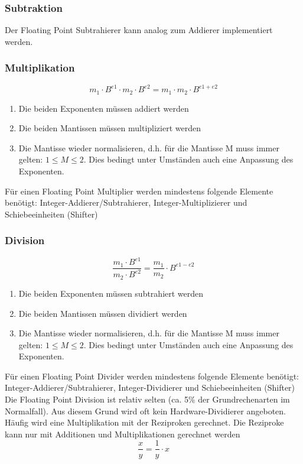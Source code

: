 \subsubsection{Subtraktion}
Der Floating Point Subtrahierer kann analog zum Addierer implementiert werden.

\subsubsection{Multiplikation}
\begin{equation}
	m_1 \cdot B^{e1} \cdot m_2 \cdot B^{e2} = m_1 \cdot m_2 \cdot B^{e1 + e2}
\end{equation}
\begin{enumerate}
	\item Die beiden Exponenten müssen addiert werden 
	\item Die beiden Mantissen müssen multipliziert werden 
	\item Die Mantisse wieder normalisieren, d.h. für die Mantisse M muss immer gelten: $1 \leq M \leq 2$. Dies bedingt unter Umständen auch eine Anpassung des Exponenten.	
\end{enumerate}
Für einen Floating Point Multiplier werden mindestens folgende Elemente benötigt: Integer-Addierer/Subtrahierer, Integer-Multiplizierer und Schiebeeinheiten (Shifter)

\subsubsection{Division}
\begin{equation}
\frac{m_1 \cdot B^{e1}}{m_2 \cdot B^{e2}} = \frac{m_1}{m_2} \cdot B^{e1 - e2}
\end{equation}
\begin{enumerate}
	\item Die beiden Exponenten müssen subtrahiert werden 
	\item  Die beiden Mantissen müssen dividiert werden 
	\item Die Mantisse wieder normalisieren, d.h. für die Mantisse M muss immer gelten: $1 \leq M \leq 2$. Dies bedingt unter Umständen auch eine Anpassung des Exponenten.	
\end{enumerate}
Für einen Floating Point Divider werden mindestens folgende Elemente benötigt: Integer-Addierer/Subtrahierer, Integer-Dividierer und Schiebeeinheiten (Shifter) \\
Die Floating Point Division ist relativ selten (ca. 5\% der Grundrechenarten im Normalfall). Aus diesem Grund wird oft kein Hardware-Dividierer angeboten. Häufig wird eine Multiplikation mit der Reziproken gerechnet. Die Reziproke kann nur mit Additionen und Multiplikationen gerechnet werden
\begin{equation}
\frac{x}{y} = \frac{1}{y} \cdot x
\end{equation}

